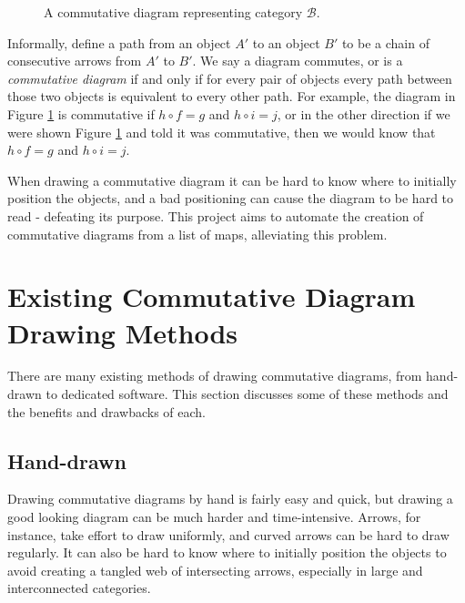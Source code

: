 \documentclass[logo,bsc,singlespacing,parskip]{infthesis}
\theoremstyle{definition}
\newcommand{\cat}[1]{\mathscr{#1}}
\begin{document}
\begin{figure}[h]
    \centering
    \caption{A commutative diagram representing category $\cat B$.}
    \label{fig:comm-diag-ex1}
\end{figure}

Informally, define a path from an object $A'$ to an object $B'$ to be a chain of consecutive arrows from $A'$ to $B'$. We say a diagram commutes, or is a \emph{commutative diagram} if and only if for every pair of objects every path between those two objects is equivalent to every other path. For example, the diagram in Figure \ref{fig:comm-diag-ex1} is commutative if $h \circ f = g$ and $h \circ i = j$, or in the other direction if we were shown Figure \ref{fig:comm-diag-ex1} and told it was commutative, then we would know that $h \circ f = g$ and $h \circ i = j$.


When drawing a commutative diagram it can be hard to know where to initially position the objects, and a bad positioning can cause the diagram to be hard to read - defeating its purpose. This project aims to automate the creation of commutative diagrams from a list of maps, alleviating this problem.

\section{Existing Commutative Diagram Drawing Methods}\label{bkg:other}
There are many existing methods of drawing commutative diagrams, from hand-drawn to dedicated software. This section discusses some of these methods and the benefits and drawbacks of each.

\subsection{Hand-drawn}
Drawing commutative diagrams by hand is fairly easy and quick, but drawing a good looking diagram can be much harder and time-intensive. Arrows, for instance, take effort to draw uniformly, and curved arrows can be hard to draw regularly. It can also be hard to know where to initially position the objects to avoid creating a tangled web of intersecting arrows, especially in large and interconnected categories. 
\end{document}
